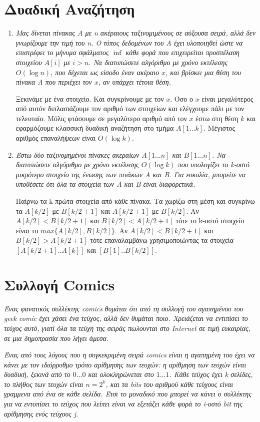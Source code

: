 \documentclass[a4paper,10pt]{article} \usepackage{anysize}
\begin{document}
\section{Δυαδική Αναζήτηση}
\begin{enumerate}
\item \textit{Μας δίνεται πίνακας Α με n ακέραιους ταξινομιμένους σε αύξουσα
σειρά, αλλά \emph{δεν γνωρίζουμε την τιμή του n}. Ο τύπος δεδομένων του Α έχει
υλοποιηθεί ώστε να επιστρέφει το μήνυμα σφάλματος $\inf$ κάθε φορά που
επιχειρείται προσπέλαση στοιχείου $A[i]$ με $i > n$. Να διατυπώσετε αλγόριθμο
με χρόνο εκτέλεσης $O(\log{n})$, που δέχεται ως είσοδο έναν ακέραιο $x$, και
βρίσκει μια θέση του πίνακα Α που περιέχει τον $x$, αν υπάρχει τέτοια θέση.}

Ξεκινάμε με ένα στοιχείο. Και συγκρίνουμε με τον $x$. Όσο ο $x$ είναι
μεγαλύτερος από αυτόν διπλασιάζουμε τον αριθμό των στοιχείων και ελέγχουμε
πάλι με τον τελευταίο. Μόλις φτάσουμε σε μεγαλύτερο αριθμό από τον $x$ έστω
στη θέση $k$ και εφαρμόζουμε κλασσική δυαδική αναζήτηση στο τμήμα $A[1...k]$. 
Μέγιστος αριθμός επαναλήψεων είναι $O(\log{k})$.
\item \textit{Έστω δύο ταξινομημένοι πίνακες ακεραίων $A[1...n]$ και
$B[1...n]$. Να διατυπώσετε αλγόριθμο με χρόνο εκτέλεσης $O(\log{k})$ που
υπολογίζει το k-οστό μικρότερο στοιχείο της ένωσης των πινάκων Α και Β. Για
ευκολία, μπορείτε να υποθέσετε ότι όλα τα στοιχεία των Α και Β είναι
διαφορετικά.}

Παίρνω τα k πρώτα στοιχεία από κάθε πίνακα. Τα χωρίζω στη μέση και
συγκρίνω τα $A[k/2]$ με $B[k/2+1]$ και $A[k/2+1]$ με $B[k/2]$. Αν
$A[k/2]<B[k/2+1]$ και $B[k/2]<A[k/2+1]$ τότε το k-οστό στοιχείο είναι το
$max\{A[k/2],B[k/2]\}$. Αν $A[k/2]<B[k/2+1]$ και $B[k/2]>A[k/2+1]$ τότε
επαναλαμβάνω χρησιμοποιώντας τα στοιχεία $[A[k/2+1]..A[k]]$ και
$[B[1]..B[k/2]]$.
\end{enumerate}
\pagebreak
\section{Συλλογή Comics}
\textit{Ένας φανατικός συλλέκτης comics θυμάται ότι από τη συλλογή του
αγαπημένου του geek comic έχει χάσει ένα τεύχος, αλλά δεν θυμάται ποιο.
Χρειάζεται να εντιπίσει το τεύχος αυτό, γιατί όλα τα τεύχη της σειράς
πωλουνται στο Internet σε τιμή ευκαιρίας, σε μια δημοπρασία που λήγει άμεσα.}

\textit{Ένας από τους λόγους που η συγκεκριμένη σειρά comics είναι η αγαπημένη του
έχει να κάνει με τον ιδιόρρυθμο τρόπο αρίθμησης των τευχών: η αρίθμηση των
τευχών είναι δυαδική, ξεκινά από το $0...0$ και ολοκληρώνεται στο $1...1$.
Κάθε τεύχος έχει k σελίδες, το πλήθος των τευχών είναι $n=2^k$, και τα bits
του αριθμού κάθε τεύχους είναι γραμμενα από ένα σε κάθε σελίδα. Έτσι το
μοναδικό που μπορεί να κάνει ο συλλέκτης για να εντοπίσει το τεύχος που λείπει
είναι να εξετάζει κάθε φορά το i-οστό bit της αρίθμησης ενός τεύχους j.}
\end{document}
